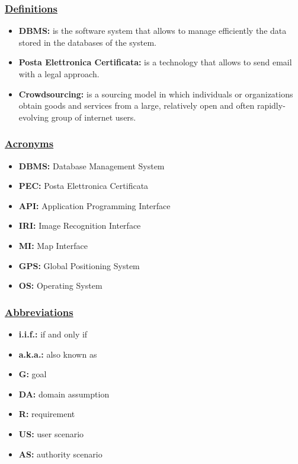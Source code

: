 	\subsubsection[Definitions]{\hyperlink{toc}{Definitions}}
		\begin{itemize}
			\item \textbf{DBMS:} is the software system that allows to manage efficiently the data stored in the databases of the system.
			\item \textbf{Posta Elettronica Certificata:} is a technology that allows to send email with a legal approach.
			\item \textbf{Crowdsourcing:} is a sourcing model in which individuals or organizations obtain goods and services from a large, relatively open and often rapidly-evolving group of internet users.
		\end{itemize}
	
	\subsubsection[Acronyms]{\hyperlink{toc}{Acronyms}}
		\begin{itemize}
			\item \textbf{DBMS:} Database Management System
			\item \textbf{PEC:} Posta Elettronica Certificata
			\item \textbf{API:} Application Programming Interface
			\item \textbf{IRI:} Image Recognition Interface
			\item \textbf{MI:} Map Interface
			\item \textbf{GPS:} Global Positioning System
			\item \textbf{OS:} Operating System
		\end{itemize}
	
	\subsubsection[Abbreviations]{\hyperlink{toc}{Abbreviations}}
		\begin{itemize}
	        \item \textbf{i.i.f.:} if and only if
	        \item \textbf{a.k.a.:} also known as
			\item \textbf{G:} goal
			\item \textbf{DA:} domain assumption
			\item \textbf{R:} requirement
			\item \textbf{US:} user scenario
			\item \textbf{AS:} authority scenario
		\end{itemize}
		
